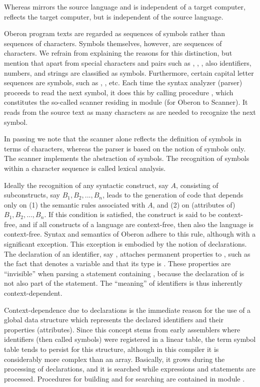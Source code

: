 Whereas  mirrors the source language and is independent of a target computer,  reflects the target computer, but is independent of the source language.

Oberon program texts are regarded as sequences of symbols rather than sequences of characters. Symbols themselves, however, are sequences of characters. We refrain from explaining the reasons for this distinction, but mention that apart from special characters and pairs such as \code{+}, \code{\&}, \code{<=}, also identifiers, numbers, and strings are classified as symbols. Furthermore, certain capital letter sequences are symbols, such as , , etc. Each time the syntax analyzer (parser) proceeds to read the next symbol, it does this by calling procedure , which constitutes the so-called scanner residing in module  (for Oberon to \RISC Scanner). It reads from the source text as many characters as are needed to recognize the next symbol.

In passing we note that the scanner alone reflects the definition of symbols in terms of characters, whereas the parser is based on the notion of symbols only. The scanner implements the abstraction of symbols. The recognition of symbols within a character sequence is called lexical analysis.

Ideally the recognition of any syntactic construct, say $A$, consisting of subconstructs, say $B_1, B_2, ... , B_n$, leads to the generation of code that depends only on (1) the semantic rules associated with $A$, and (2) on (attributes of) $B_1, B_2, ... , B_n$. If this condition is satisfied, the construct is said to be context-free, and if all constructs of a language are context-free, then also the language is context-free. Syntax and semantics of Oberon adhere to this rule, although with a significant exception. This exception is embodied by the notion of declarations. The declaration of an identifier, say , attaches permanent properties to , such as the fact that  denotes a variable and that its type is . These properties are ``invisible'' when parsing a statement containing , because the declaration of  is not also part of the statement. The ``meaning'' of identifiers is thus inherently context-dependent.

Context-dependence due to declarations is the immediate reason for the use of a global data structure which represents the declared identifiers and their properties (attributes). Since this concept stems from early assemblers where identifiers (then called symbols) were registered in a linear table, the term symbol table tends to persist for this structure, although in this compiler it is considerably more complex than an array. Basically, it grows during the processing of declarations, and it is searched while expressions and statements are processed. Procedures for building and for searching are contained in module . %


